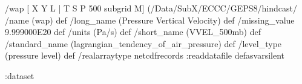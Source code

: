 \begin{ingrid}
 /wap {
[ X Y L | T S P 500 subgrid M] (/Data/SubX/ECCC/GEPS8/hindcast/%
/name (wap) def
 /long_name (Pressure Vertical Velocity) def
 /missing_value 9.999000E20 def
 /units (Pa/s) def
 /short_name (VVEL_500mb) def
 /standard_name (lagrangian_tendency_of_air_pressure) def
 /level_type (pressure level) def
 /realarraytype netcdfrecords :readdatafile
}defasvarsilent

:dataset
\end{ingrid}
